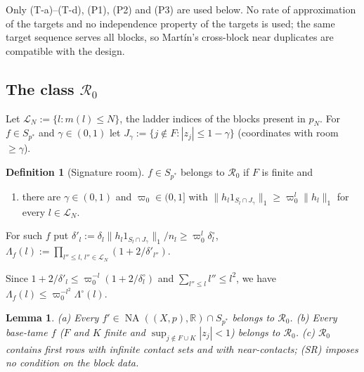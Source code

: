 \documentclass[10pt]{amsart}
\newtheorem{lemma}[theorem]{Lemma}
\theoremstyle{definition}
\newtheorem{definition}[theorem]{Definition}
\theoremstyle{remark}
\newcommand{\NA}{\operatorname{NA}}
\newcommand{\R}{\mathbb R}
\begin{document}
Only (T-a)--(T-d), (P1), (P2) and (P3) are used below.  No rate of
approximation of the targets and no independence property of the targets
is used; the same target sequence serves all blocks, so Mart\'in's
cross-block near duplicates are compatible with the design.

\subsection{The class $\mathcal R_0$}
Let $\mathcal L_N:=\{l:m(l)\le N\}$, the ladder indices of the blocks
present in $p_N$.  For $f\in S_{p^*}$ and $\gamma\in(0,1)$ let
$J_\gamma:=\{j\notin F:|z_j|\le1-\gamma\}$ (coordinates with room
$\ge\gamma$).

\begin{definition}[Signature room]\label{def:R0}
$f\in S_{p^*}$ belongs to $\mathcal R_0$ if $F$ is finite and
\begin{enumerate}
\item[(SR)] there are $\gamma\in(0,1)$ and $\varpi_0\in(0,1]$ with
$\|h_l1_{S_l\cap J_\gamma}\|_1\ge\varpi_0^l\|h_l\|_1$ for every
$l\in\mathcal L_N$.
\end{enumerate}
For such $f$ put $\delta'_l:=\delta_l\|h_l1_{S_l\cap J_\gamma}\|_1/n_l\ge
\varpi_0^l\delta^\circ_l$, $\Lambda_f(l):=\prod_{l''\le l,\,l''\in
\mathcal L_N}(1+2/\delta'_{l''})$.
\end{definition}

Since $1+2/\delta'_l\le\varpi_0^{-l}(1+2/\delta^\circ_l)$ and
$\sum_{l''\le l}l''\le l^2$, we have $\Lambda_f(l)\le\varpi_0^{-l^2}
\Lambda^\circ(l)$.

\begin{lemma}\label{lem:R0}
\textup{(a)} Every $f'\in\NA((X,p),\R)\cap S_{p^*}$ belongs to
$\mathcal R_0$.  \textup{(b)} Every \emph{base-tame} $f$ \textup{(}$F$ and
$K$ finite and $\sup_{j\notin F\cup K}|z_j|<1$\textup{)} belongs to
$\mathcal R_0$.  \textup{(c)} $\mathcal R_0$ contains first rows with
infinite contact sets and with near-contacts; \textup{(SR)} imposes no
condition on the block data.
\end{lemma}
\end{document}
